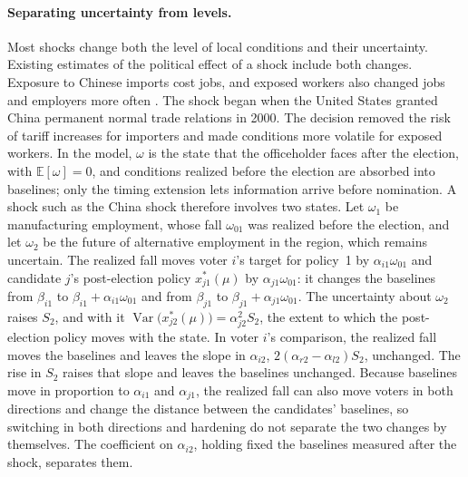 \documentclass[12pt,letterpaper]{article}
\begin{document}
\paragraph{Separating uncertainty from levels.}
Most shocks change both the level of local conditions and their uncertainty. Existing estimates of the political effect of a shock include both changes. Exposure to Chinese imports cost jobs, and exposed workers also changed jobs and employers more often \citep{AutorDornHansonSong2014}. The shock began when the United States granted China permanent normal trade relations in 2000. The decision removed the risk of tariff increases for importers \citep{PierceSchott2016,HandleyLimao2017} and made conditions more volatile for exposed workers. In the model, $\omega$ is the state that the officeholder faces after the election, with $\mathbb{E}[\omega]=0$, and conditions realized before the election are absorbed into baselines; only the timing extension lets information arrive before nomination. A shock such as the China shock therefore involves two states. Let $\omega_1$ be manufacturing employment, whose fall $\omega_{01}$ was realized before the election, and let $\omega_2$ be the future of alternative employment in the region, which remains uncertain. The realized fall moves voter $i$'s target for policy~1 by $\alpha_{i1}\omega_{01}$ and candidate $j$'s post-election policy $x^*_{j1}(\mu)$ by $\alpha_{j1}\omega_{01}$: it changes the baselines from $\beta_{i1}$ to $\beta_{i1}+\alpha_{i1}\omega_{01}$ and from $\beta_{j1}$ to $\beta_{j1}+\alpha_{j1}\omega_{01}$. The uncertainty about $\omega_2$ raises $S_2$, and with it $\operatorname{Var}\big(x^*_{j2}(\mu)\big)=\alpha_{j2}^2S_2$, the extent to which the post-election policy moves with the state. In voter $i$'s comparison, the realized fall moves the baselines and leaves the slope in $\alpha_{i2}$, $2(\alpha_{r2}-\alpha_{l2})S_2$, unchanged. The rise in $S_2$ raises that slope and leaves the baselines unchanged. Because baselines move in proportion to $\alpha_{i1}$ and $\alpha_{j1}$, the realized fall can also move voters in both directions and change the distance between the candidates' baselines, so switching in both directions and hardening do not separate the two changes by themselves. The coefficient on $\alpha_{i2}$, holding fixed the baselines measured after the shock, separates them.
\end{document}
